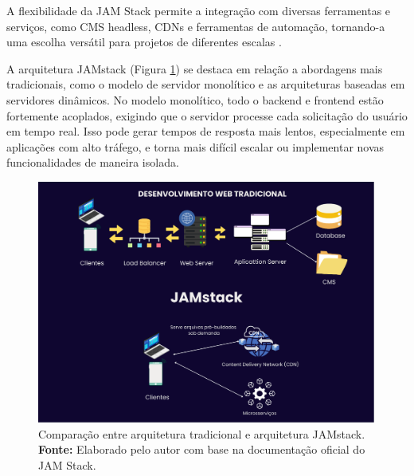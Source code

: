 A flexibilidade da JAM Stack permite a integração com diversas ferramentas e serviços, como CMS headless, CDNs e ferramentas de automação, tornando-a uma escolha versátil para projetos de diferentes escalas \citep{netlifyjamstack}.

A arquitetura JAMstack (Figura \ref{fig:jamStack Arquitetura}) se destaca em relação a abordagens mais tradicionais, como o modelo de servidor monolítico e as arquiteturas baseadas em servidores dinâmicos. No modelo monolítico, todo o backend e frontend estão fortemente acoplados, exigindo que o servidor processe cada solicitação do usuário em tempo real. Isso pode gerar tempos de resposta mais lentos, especialmente em aplicações com alto tráfego, e torna mais difícil escalar ou implementar novas funcionalidades de maneira isolada.

\begin{figure}[H]
    \centering
    \includegraphics[height=8cm, keepaspectratio]{img/arquitetura/JAM STACK.png}
    \caption{ Comparação entre arquitetura tradicional e arquitetura JAMstack. \\
        \textbf{Fonte:} Elaborado pelo autor com base na documentação oficial do JAM Stack.}
    \label{fig:jamStack Arquitetura}
\end{figure}


